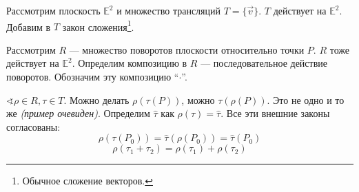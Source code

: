 Рассмотрим плоскость \(\mathbb{E}^2\) и множество трансляций \(T = \{\vec{v}\}\). \(T\) действует на \(\mathbb{E}^2\). Добавим в \(T\) закон сложения\footnote{Обычное сложение векторов.}.

Рассмотрим \(R\) --- множество поворотов плоскости относительно точки \(P\). \(R\) тоже действует на \(\mathbb{E}^2\). Определим композицию в \(R\) --- последовательное действие поворотов. Обозначим эту композицию ``\( \cdot \)''.

\(\sphericalangle \rho \in R, \tau \in T\). Можно делать \(\rho(\tau(P))\), можно \(\tau(\rho(P))\). Это не одно и то же \textit{(пример очевиден)}. Определим \(\hat{\tau}\) как \(\rho(\tau) =\hat{\tau}\). Все эти внешние законы согласованы:
\[\rho(\tau(P_0)) = \hat{\tau}(\rho(P_0)) = \hat{\tau}(P_0)\]
\[\rho(\tau_1 + \tau_2) = \rho(\tau_1) + \rho(\tau_2)\]


